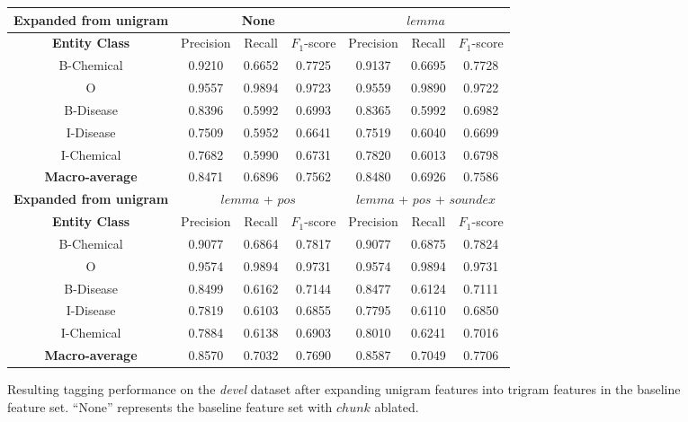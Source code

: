 \documentclass[10pt, oneside]{article}
\begin{document}
\begin{figure}[h]
\begin{center}
\fontsize{9}{11}\selectfont
\begin{tabular}{|*{7}{c|}}\hline
\textbf{Expanded from unigram}  & \multicolumn{3}{c|}{None} & \multicolumn{3}{c|}{$lemma$}  \\ \hline 
\textbf{Entity Class} & Precision & Recall & $F_1$-score & Precision & Recall & $F_1$-score  \\ \hline
B-Chemical & 0.9210 & 0.6652 & 0.7725 & 0.9137 & 0.6695 & 0.7728 \\ \hline
O                 & 0.9557 & 0.9894 & 0.9723 & 0.9559 & 0.9890 & 0.9722\\ \hline
B-Disease   & 0.8396 & 0.5992 & 0.6993 & 0.8365 & 0.5992 & 0.6982 \\ \hline
I-Disease    & 0.7509 & 0.5952 & 0.6641 & 0.7519 & 0.6040 & 0.6699 \\ \hline
I-Chemical  & 0.7682 & 0.5990 & 0.6731 & 0.7820 & 0.6013 & 0.6798 \\ \hline
\textbf{Macro-average} & 0.8471 & 0.6896 & 0.7562 & 0.8480 & 0.6926 & 0.7586 \\ \hline \hline
\textbf{Expanded from unigram}  & \multicolumn{3}{c|}{$lemma$ + $pos$} & \multicolumn{3}{c|}{$lemma$ + $pos$ + $soundex$} \\ \hline 
\textbf{Entity Class} & Precision & Recall & $F_1$-score & Precision & Recall & $F_1$-score  \\ \hline
B-Chemical & 0.9077 & 0.6864 & 0.7817 & 0.9077 & 0.6875 & 0.7824 \\ \hline
O                 & 0.9574 & 0.9894 & 0.9731 & 0.9574 & 0.9894 & 0.9731 \\ \hline
B-Disease   & 0.8499 & 0.6162 & 0.7144 & 0.8477 & 0.6124 & 0.7111 \\ \hline
I-Disease    & 0.7819 & 0.6103 & 0.6855 & 0.7795 & 0.6110 & 0.6850 \\ \hline
I-Chemical  & 0.7884 & 0.6138 & 0.6903 & 0.8010 & 0.6241 & 0.7016 \\ \hline
\textbf{Macro-average} & 0.8570 & 0.7032 & 0.7690 & 0.8587 & 0.7049 & 0.7706 \\ \hline
\end{tabular}
\caption{\label{fig:trigrams} Resulting tagging performance on the \emph{devel} dataset after expanding unigram features into trigram features in the baseline feature set. ``None'' represents the baseline feature set with $chunk$ ablated.}
\end{center}
\end{figure}
\end{document}
